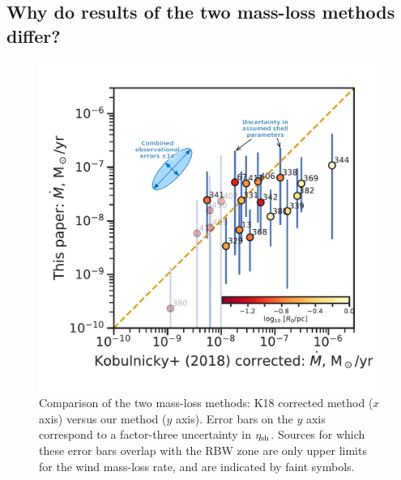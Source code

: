 \subsection{Why do results of the two mass-loss methods differ?}
\label{sec:underst-diff-betw}

\begin{figure}
  \centering
  \includegraphics[width=\linewidth]{figs/K18-mdot-corrected-comparison-R0-edited}
  \caption{Comparison of the two mass-loss methods: K18 corrected
    method (\(x\) axis) versus our method (\(y\) axis).  Error bars on
    the \(y\) axis correspond to a factor-three uncertainty in
    \(\eta_{\text{sh}}\).  Sources for which these error bars overlap with
    the RBW zone are only upper limits for the wind mass-loss rate,
    and are indicated by faint symbols.}
  \label{fig:mass-loss-comparison}
\end{figure}

